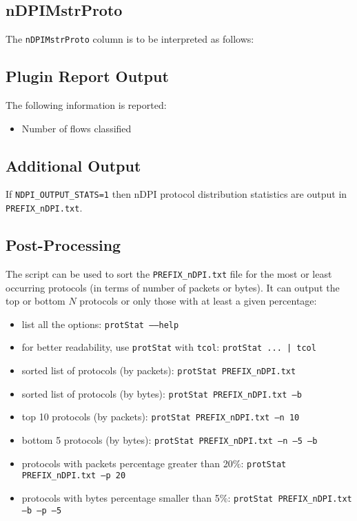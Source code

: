\documentclass[documentation]{subfiles}
\begin{document}
\subsection{nDPIMstrProto}\label{nDPIMstrProto}
The {\tt nDPIMstrProto} column is to be interpreted as follows:

\subsection{Plugin Report Output}
The following information is reported:
\begin{itemize}
    \item Number of flows classified
\end{itemize}

\subsection{Additional Output}
If {\tt NDPI\_OUTPUT\_STATS=1} then nDPI protocol distribution statistics are output in {\tt PREFIX\_nDPI.txt}.\\

\subsection{Post-Processing}
The {\tt{}} script can be used to sort the {\tt PREFIX\_nDPI.txt} file for the most or least occurring protocols (in terms of number of packets or bytes).
It can output the top or bottom $N$ protocols or only those with at least a given percentage:
\begin{itemize}
    \item list all the options: {\tt protStat --{}--help}
    \item for better readability, use {\tt protStat} with {\tt tcol}: {\tt protStat ... | tcol}
    \item sorted list of protocols (by packets): {\tt protStat PREFIX\_nDPI.txt}
    \item sorted list of protocols (by bytes): {\tt protStat PREFIX\_nDPI.txt --b}
    \item top 10 protocols (by packets): {\tt protStat PREFIX\_nDPI.txt --n 10}
    \item bottom 5 protocols (by bytes): {\tt protStat PREFIX\_nDPI.txt --n --5 --b}
    \item protocols with packets percentage greater than 20\%: {\tt protStat PREFIX\_nDPI.txt --p 20}
    \item protocols with bytes percentage smaller than 5\%: {\tt protStat PREFIX\_nDPI.txt --b --p --5}
\end{itemize}
\end{document}
